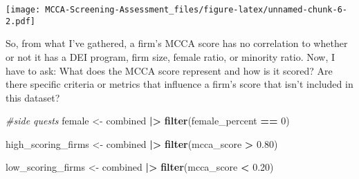 \documentclass[
]{article}
\newenvironment{Shaded}{\begin{snugshade}}{\end{snugshade}}
\newcommand{\CommentTok}[1]{\textcolor[rgb]{0.56,0.35,0.01}{\textit{#1}}}
\newcommand{\DecValTok}[1]{\textcolor[rgb]{0.00,0.00,0.81}{#1}}
\newcommand{\FloatTok}[1]{\textcolor[rgb]{0.00,0.00,0.81}{#1}}
\newcommand{\FunctionTok}[1]{\textcolor[rgb]{0.13,0.29,0.53}{\textbf{#1}}}
\newcommand{\NormalTok}[1]{#1}
\newcommand{\OtherTok}[1]{\textcolor[rgb]{0.56,0.35,0.01}{#1}}
\newcommand{\SpecialCharTok}[1]{\textcolor[rgb]{0.81,0.36,0.00}{\textbf{#1}}}
\begin{document}
\texttt{[image: MCCA-Screening-Assessment\_files/figure-latex/unnamed-chunk-6-2.pdf]}

So, from what I've gathered, a firm's MCCA score has no correlation to
whether or not it has a DEI program, firm size, female ratio, or
minority ratio. Now, I have to ask: What does the MCCA score represent
and how is it scored? Are there specific criteria or metrics that
influence a firm's score that isn't included in this dataset?

\begin{Shaded}
\begin{Highlighting}[]
\CommentTok{\#side quests}
\NormalTok{female }\OtherTok{\textless{}{-}}\NormalTok{ combined }\SpecialCharTok{|\textgreater{}}
  \FunctionTok{filter}\NormalTok{(female\_percent }\SpecialCharTok{==} \DecValTok{0}\NormalTok{)}

\NormalTok{high\_scoring\_firms }\OtherTok{\textless{}{-}}\NormalTok{ combined }\SpecialCharTok{|\textgreater{}}
  \FunctionTok{filter}\NormalTok{(mcca\_score }\SpecialCharTok{\textgreater{}} \FloatTok{0.80}\NormalTok{)}

\NormalTok{low\_scoring\_firms }\OtherTok{\textless{}{-}}\NormalTok{ combined }\SpecialCharTok{|\textgreater{}}
  \FunctionTok{filter}\NormalTok{(mcca\_score }\SpecialCharTok{\textless{}} \FloatTok{0.20}\NormalTok{)}
\end{Highlighting}
\end{Shaded}
\end{document}
